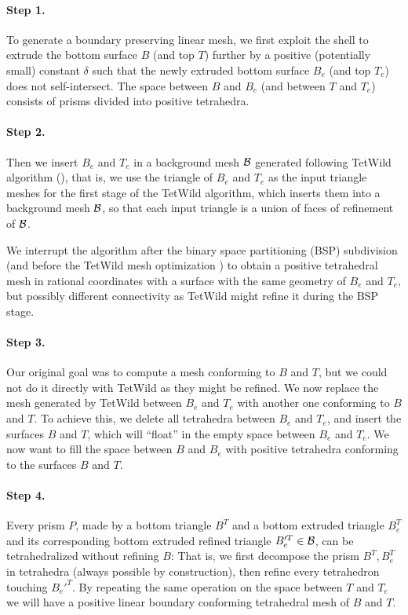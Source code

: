 \paragraph{Step 1.}
To generate a boundary preserving linear mesh, we first exploit the shell to extrude the bottom surface $B$ (and top $T$) {further} by a positive (potentially small) constant $\delta$ such that the newly extruded bottom surface $B_e$ (and top $T_e$) does not self-intersect. The space between $B$ and $B_e$ (and between $T$ and $T_e$) consists of prisms {divided} into positive tetrahedra. 

\paragraph{Step 2.}
Then we insert $B_e$ and $T_e$ in a background mesh $\mathcal{B}$ generated following TetWild algorithm (\cite[Section 3.1]{hu2018tetrahedral}), that is, we use the triangle of $B_e$ and $T_e$ as the input triangle meshes for the first stage of the TetWild algorithm, which inserts them into a background mesh $\mathcal{B}$, so that
each input triangle is a union of faces of refinement of $\mathcal{B}$.


We interrupt the algorithm after the  binary space partitioning (BSP) subdivision (and before the TetWild mesh optimization \cite[Section 3.2]{hu2018tetrahedral})
to obtain a positive tetrahedral mesh in rational coordinates with a surface with the same geometry of $B_e$ and $T_e$, but possibly different connectivity as TetWild might refine it during the BSP stage.

\paragraph{Step 3.}
Our original goal was to compute a mesh conforming to $B$ and $T$, but we could not do it directly with TetWild as they might be refined. We now replace the mesh generated by TetWild between $B_e$ and $T_e$ with another one conforming to $B$ and $T$. To achieve this, we delete all tetrahedra between $B_e$ and $T_e$, and insert the surfaces $B$ and $T$, which will ``float'' in the empty space between $B_e$ and $T_e$. We now want to fill the space between $B$ and $B_e$ with positive tetrahedra conforming to the surfaces $B$ and $T$. 

\paragraph{Step 4.}
Every prism $P$, made by a bottom triangle $B^T$ and a bottom extruded triangle $B_e^T$ and its corresponding bottom extruded refined triangle $B_e'^T \in \mathcal{B}$, can be tetrahedralized without refining $B$: That is, we first decompose the prism $B^T, B_e^T$ in tetrahedra (always possible by construction), then refine every tetrahedron touching $B_e'^T$. By repeating the same operation on the space between $T$ and $T_e$ we will have a positive linear boundary conforming tetrahedral mesh of $B$ and $T$. 

